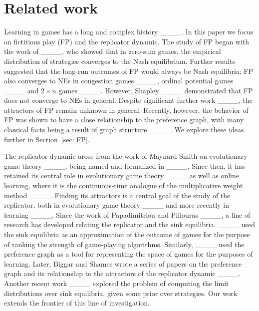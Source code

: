\section{Related work}
\label{sec: related}

Learning in games has a long and complex history ____. In this paper we focus on fictitious play (FP) and the replicator dynamic. The study of FP began with the work of ____, who showed that in zero-sum games, the empirical distribution of strategies converges to the Nash equilibrium. Further results suggested that the long-run outcomes of FP would always be Nash equilibria; FP also converges to NEs in congestion games ____, ordinal potential games ____ and $2\times n$ games ____. However, Shapley ____ demonstrated that FP does not converge to NEs in general. Despite significant further work ____, the attractors of FP remain unknown in general. Recently, however, the behavior of FP was shown to have a close relationship to the preference graph, with many classical facts being a result of graph structure ____. We explore these ideas further in Section~\ref{sec: FP}.

The replicator dynamic arose from the work of Maynard Smith on evolutionary game theory ____, being named and formalized in ____. Since then, it has retained its central role in evolutionary game theory ____ as well as online learning, where it is the continuous-time analogue of the multiplicative weight method ____. Finding its attractors is a central goal of the study of the replicator, both in evolutionary game theory ____ and more recently in learning ____. Since the work of Papadimitriou and Piliouras ____, a line of research has developed relating the replicator and the sink equilibria. ____ used the sink equilibria as an approximation of the outcome of games for the purpose of ranking the strength of game-playing algorithms. Similarly, ____ used the preference graph as a tool for representing the space of games for the purposes of learning. Later, Biggar and Shames wrote a series of papers on the preference graph and its relationship to the attractors of the replicator dynamic ____. Another recent work ____ explored the problem of computing the limit distributions over sink equilibria, given some prior over strategies. Our work extends the frontier of this line of investigation.